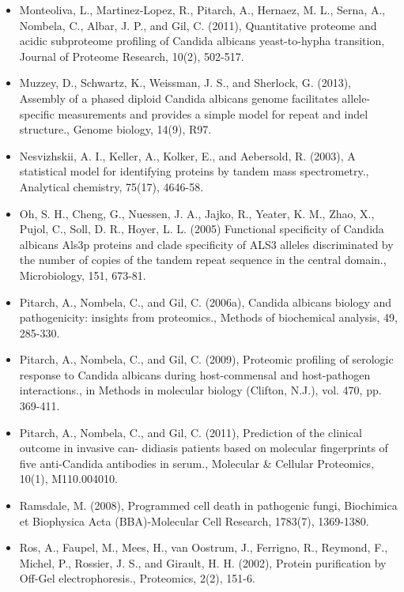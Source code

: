 \begin{itemize}
\item[]{%
Monteoliva, L., Martinez-Lopez, R., Pitarch, A., Hernaez, M. L., Serna, A., Nombela, C., Albar,
J. P., and Gil, C. (2011), Quantitative proteome and acidic subproteome profiling of Candida
albicans yeast-to-hypha transition, Journal of Proteome Research, 10(2), 502-517.
}

\item[]{%
Muzzey, D., Schwartz, K., Weissman, J. S., and Sherlock, G. (2013), Assembly of a phased
diploid Candida albicans genome facilitates allele-specific measurements and provides a
simple model for repeat and indel structure., Genome biology, 14(9), R97.
}

\item[]{%
Nesvizhskii, A. I., Keller, A., Kolker, E., and Aebersold, R. (2003), A statistical model for 
identifying proteins by tandem mass spectrometry., Analytical chemistry, 75(17), 4646-58.
}

\item[]{
Oh, S. H., Cheng, G., Nuessen, J. A., Jajko, R., Yeater, K. M., Zhao, X., Pujol, C., Soll, D. R., Hoyer,  L. L. (2005)
Functional specificity of Candida albicans Als3p proteins and clade specificity of ALS3 
alleles discriminated by the number of copies of the tandem repeat sequence in the central domain.,
Microbiology, 151, 673-81.
}

\item[]{%
Pitarch, A., Nombela, C., and Gil, C. (2006a), Candida albicans biology and pathogenicity:
insights from proteomics., 
Methods of biochemical analysis, 49, 285-330.
}

\item[]{%
Pitarch, A., Nombela, C., and Gil, C. (2009), Proteomic profiling of serologic response to 
Candida albicans during host-commensal and host-pathogen interactions., 
in Methods in molecular biology (Clifton, N.J.), vol. 470, pp. 369-411.
}

\item[]{%
Pitarch, A., Nombela, C., and Gil, C. (2011), Prediction of the clinical outcome in invasive can-
didiasis patients based on molecular fingerprints of five anti-Candida antibodies in serum.,
Molecular \& Cellular Proteomics, 10(1), M110.004010.
}

\item[]{%
Ramsdale, M. (2008), Programmed cell death in pathogenic fungi, Biochimica et Biophysica
Acta (BBA)-Molecular Cell Research, 1783(7), 1369-1380.
}


\item[]{%
Ros, A., Faupel, M., Mees, H., van Oostrum, J., Ferrigno, R., Reymond, F., Michel, P., Rossier,
J. S., and Girault, H. H. (2002), Protein purification by Off-Gel electrophoresis., Proteomics,
2(2), 151-6.
}


\end{itemize}
